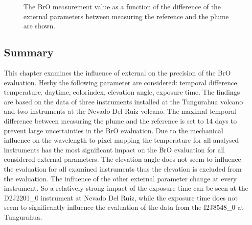 \documentclass  [
  paper    = a4,
  BCOR     = 10mm,
  twoside,
  fontsize = 12pt,
  fleqn,
  toc      = bibnumbered,
  toc      = listofnumbered,
  numbers  = noendperiod,
  headings = normal,
  listof   = leveldown,
  version  = 3.03
]                                       {scrreprt}
\begin{document}
\begin{figure}
{}
\caption{The BrO measurement value as a function of the difference of the external parameters between measuring the reference and the plume are shown.}
	\label{fig:difftempbroallinstruments}
\end{figure}
\FloatBarrier
	\subsection*{Summary}
This chapter examines the influence of external on the precision of the BrO evaluation. Herby the following parameter are considered: 
temporal difference, temperature, daytime, colorindex, elevation angle, exposure time.  The findings are based on the data of three instruments installed at the Tungurahua volcano and two instruments at the Nevado Del Ruiz volcano. The maximal temporal difference between measuring the plume and the reference is set to 14 days to prevent large uncertainties in the BrO evaluation. Due to the mechanical influence on the wavelength to pixel mapping the temperature for all analysed instruments has the most significant impact on the BrO evaluation for all considered external parameters. The elevation angle does not seem to influence the evaluation for all examined instruments thus the elevation is excluded from the evaluation. The influence of the other external parameter change at every instrument. So a relatively strong impact of the exposure time can be seen at the D2J2201\_0 instrument at Nevado Del Ruiz, while the exposure time does not seem to significantly influence the evaluation of the data from the  I2J8548\_0 at Tungurahua. 
	
\end{document}
